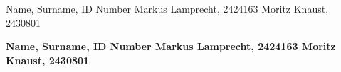 \documentclass
[twoside,english,colorbacktitle,accentcolor=tud9c]
{tudexercise}
\newcommand{\studentdata}{Markus Lamprecht, 2424163 \qquad Moritz Knaust, 2430801}
\begin{document}
	
	\hwtitle{}
	\maketitle
	
	\begin{examheader}
		\normalsize
		\vspace{-1em}
		Name, Surname, ID Number \hfill \studentdata{}
		\vspace{-1em}
	\end{examheader} 
	
	\textbf{Name, Surname, ID Number \hfill \studentdata{}}
	
	
	
	
	
\end{document}

